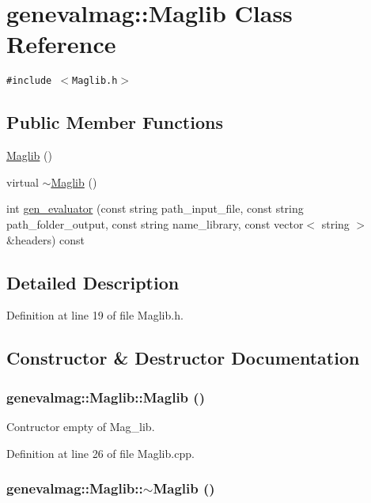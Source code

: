 \hypertarget{classgenevalmag_1_1Maglib}{
\section{genevalmag::Maglib Class Reference}
\label{classgenevalmag_1_1Maglib}
}
{\tt \#include $<$Maglib.h$>$}

\subsection*{Public Member Functions}
\begin{CompactItemize}
\item 
\hyperlink{classgenevalmag_1_1Maglib_aba45ec8699f82e6d483a53e14a3466a}{Maglib} ()
\item 
virtual \hyperlink{classgenevalmag_1_1Maglib_43af6f1f2439a9bb50f6fb273b48739c}{$\sim$Maglib} ()
\item 
int \hyperlink{classgenevalmag_1_1Maglib_b6c7b296368fe019f7e7fcf690b5e241}{gen\_\-evaluator} (const string path\_\-input\_\-file, const string path\_\-folder\_\-output, const string name\_\-library, const vector$<$ string $>$ \&headers) const 
\end{CompactItemize}


\subsection{Detailed Description}


Definition at line 19 of file Maglib.h.

\subsection{Constructor \& Destructor Documentation}
\hypertarget{classgenevalmag_1_1Maglib_aba45ec8699f82e6d483a53e14a3466a}{
\subsubsection[{Maglib}]{\setlength{\rightskip}{0pt plus 5cm}genevalmag::Maglib::Maglib ()}}
\label{classgenevalmag_1_1Maglib_aba45ec8699f82e6d483a53e14a3466a}


Contructor empty of Mag\_\-lib. 

Definition at line 26 of file Maglib.cpp.\hypertarget{classgenevalmag_1_1Maglib_43af6f1f2439a9bb50f6fb273b48739c}{
\subsubsection[{$\sim$Maglib}]{\setlength{\rightskip}{0pt plus 5cm}genevalmag::Maglib::$\sim$Maglib ()}}
\label{classgenevalmag_1_1Maglib_43af6f1f2439a9bb50f6fb273b48739c}


